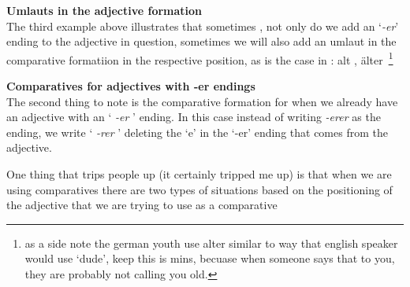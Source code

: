 \documentclass[a4paper,twocolumn,10pt]{article}
\newcommand{\newpar}
{\par \vspace{0.3cm}}
\begin{document}

\textbf{Umlauts in the adjective formation}\\

The third example above illustrates that sometimes , not only do we add an
`\textit{-er}' ending to the adjective in question, sometimes we will also add
an umlaut in the comparative formatiion in the respective position, as is the
case in : alt , älter~\footnote{as a side note the german youth use alter
	similar to way that english speaker would use `dude', keep this is mins,
	becuase when someone says that to you, they are probably not calling you
	old.}\newpar

\textbf{Comparatives for adjectives with -er endings}\\

The second thing to note is the comparative formation for when we already have
an adjective with an ` \textit{-er} ' ending.  In this case instead of writing
\textit{-erer} as the ending, we write ` \textit{-rer} ' deleting the `e' in the
`-er' ending that comes from the adjective. \newpar



One thing that trips people up (it certainly
tripped me up) is that when we are using comparatives there are two types of
situations based on the positioning of the adjective that we are trying to use
as a comparative


\end{document}
